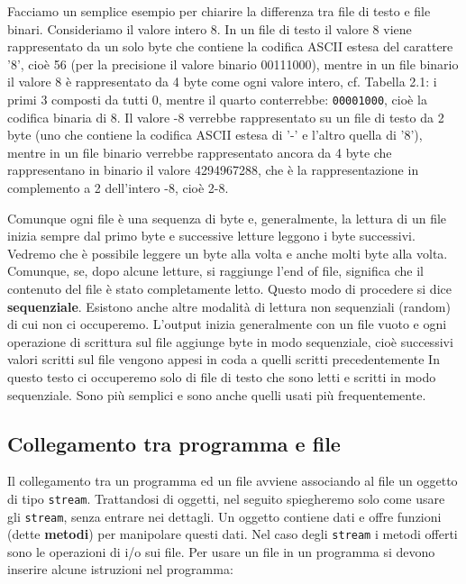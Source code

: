 \documentclass[a4paper,12pt]{book}
\begin{document}
Facciamo un semplice esempio per chiarire la differenza tra file di testo e file binari.
Consideriamo il valore intero 8.
In un file di testo il valore 8 viene rappresentato da un solo byte che contiene la codifica ASCII estesa del carattere '8', cioè 56 (per la precisione il valore binario 00111000), mentre in un file binario il valore 8 è rappresentato da 4 byte come ogni valore intero, cf. Tabella 2.1: i primi 3 composti da tutti 0, mentre il quarto conterrebbe: \texttt{00001000}, cioè la codifica binaria di 8.
Il valore -8 verrebbe rappresentato su un file di testo da 2 byte (uno che contiene la codifica ASCII estesa di '-' e l'altro quella di '8'), mentre in un file binario verrebbe rappresentato ancora da 4 byte che rappresentano in binario il valore 4294967288, che è la rappresentazione in complemento a 2 dell'intero -8, cioè 2-8.

Comunque ogni file è una sequenza di byte e, generalmente, la lettura di un file inizia sempre dal primo byte e successive letture leggono i byte successivi. Vedremo che è possibile leggere un byte alla volta e anche molti byte alla volta. Comunque, se, dopo alcune letture, si raggiunge l'end of file, significa che il contenuto del file è stato completamente letto.
Questo modo di procedere si dice \textbf{sequenziale}.
Esistono anche altre modalità di lettura non sequenziali (random) di cui non ci occuperemo.
L'output inizia generalmente con un file vuoto e ogni operazione di scrittura sul file aggiunge byte in modo sequenziale, cioè successivi valori scritti sul file vengono appesi in coda a quelli scritti precedentemente In questo testo ci occuperemo solo di file di testo che sono letti e scritti in modo sequenziale. Sono più semplici e sono anche quelli usati più frequentemente.

\subsection{Collegamento tra programma e file}
Il collegamento tra un programma ed un file avviene associando al file un oggetto di tipo \texttt{stream}.
Trattandosi di oggetti, nel seguito spiegheremo solo come usare gli \texttt{stream}, senza entrare nei dettagli.
Un oggetto contiene dati e offre funzioni (dette \textbf{metodi}) per manipolare questi dati.
Nel caso degli \texttt{stream} i metodi offerti sono le operazioni di i/o sui file.
Per usare un file in un programma si devono inserire alcune istruzioni nel programma: 
\end{document}
